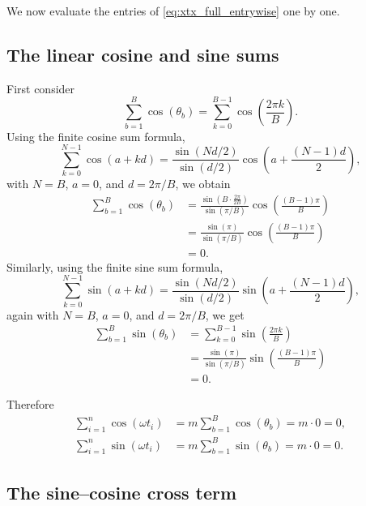 \documentclass[11pt]{article}
\begin{document}
We now evaluate the entries of \eqref{eq:xtx_full_entrywise} one by one.

\subsection*{The linear cosine and sine sums}

First consider
\[
\sum_{b=1}^B \cos(\theta_b)
=
\sum_{k=0}^{B-1}\cos\!\left(\frac{2\pi k}{B}\right).
\]
Using the finite cosine sum formula,
\[
\sum_{k=0}^{N-1}\cos(a+kd)
=
\frac{\sin(Nd/2)}{\sin(d/2)}
\cos\!\left(a+\frac{(N-1)d}{2}\right),
\]
with $N=B$, $a=0$, and $d=2\pi/B$, we obtain
\begin{align*}
\sum_{b=1}^B \cos(\theta_b)
&=
\frac{\sin\!\left(B\cdot \frac{2\pi}{2B}\right)}{\sin(\pi/B)}
\cos\!\left(\frac{(B-1)\pi}{B}\right)\\
&=
\frac{\sin(\pi)}{\sin(\pi/B)}
\cos\!\left(\frac{(B-1)\pi}{B}\right)\\
&=
0.
\end{align*}
Similarly, using the finite sine sum formula,
\[
\sum_{k=0}^{N-1}\sin(a+kd)
=
\frac{\sin(Nd/2)}{\sin(d/2)}
\sin\!\left(a+\frac{(N-1)d}{2}\right),
\]
again with $N=B$, $a=0$, and $d=2\pi/B$, we get
\begin{align*}
\sum_{b=1}^B \sin(\theta_b)
&=
\sum_{k=0}^{B-1}\sin\!\left(\frac{2\pi k}{B}\right)\\
&=
\frac{\sin(\pi)}{\sin(\pi/B)}
\sin\!\left(\frac{(B-1)\pi}{B}\right)\\
&=
0.
\end{align*}

Therefore
\begin{align}
\sum_{i=1}^n \cos(\omega t_i)
&=
m\sum_{b=1}^B \cos(\theta_b)
=
m\cdot 0
=
0,
\label{eq:linear_cos_sum_subject}\\
\sum_{i=1}^n \sin(\omega t_i)
&=
m\sum_{b=1}^B \sin(\theta_b)
=
m\cdot 0
=
0.
\label{eq:linear_sin_sum_subject}
\end{align}

\subsection*{The sine--cosine cross term}
\end{document}
